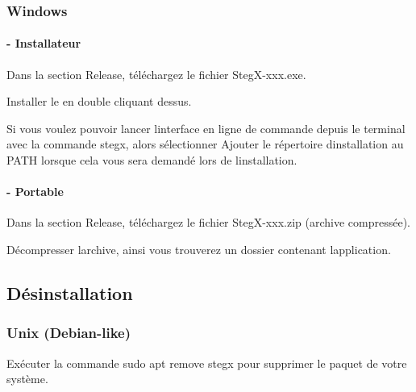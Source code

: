 \subsubsection*{Windows }

\paragraph*{-\/ Installateur}


\begin{DoxyEnumerate}
\item Dans la section {\ttfamily Release}, téléchargez le fichier {\ttfamily Steg\+X-\/xxx.\+exe}.
\item Installer le en double cliquant dessus.
\item Si vous voulez pouvoir lancer l\textquotesingle{}interface en ligne de commande depuis le terminal avec la commande {\ttfamily stegx}, alors sélectionner {\ttfamily Ajouter le répertoire d\textquotesingle{}installation au P\+A\+TH} lorsque cela vous sera demandé lors de l\textquotesingle{}installation.
\end{DoxyEnumerate}

\paragraph*{-\/ Portable}


\begin{DoxyEnumerate}
\item Dans la section {\ttfamily Release}, téléchargez le fichier {\ttfamily Steg\+X-\/xxx.\+zip} (archive compressée).
\item Décompresser l\textquotesingle{}archive, ainsi vous trouverez un dossier contenant l\textquotesingle{}application.
\end{DoxyEnumerate}





\subsection*{Désinstallation }

\subsubsection*{Unix (Debian-\/like) }

Exécuter la commande {\ttfamily sudo apt remove stegx} pour supprimer le paquet de votre système.

